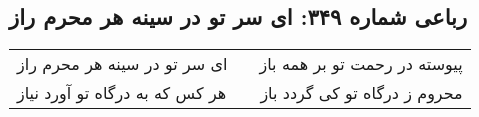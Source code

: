 \begin{center}
\section*{رباعی شماره ۳۴۹: ای سر تو در سینه هر محرم راز}
\label{sec:sh349}
\begin{longtable}{l p{0.5cm} r}
ای سر تو در سینه هر محرم راز
&&
پیوسته در رحمت تو بر همه باز
\\
هر کس که به درگاه تو آورد نیاز
&&
محروم ز درگاه تو کی گردد باز
\\
\end{longtable}
\end{center}
